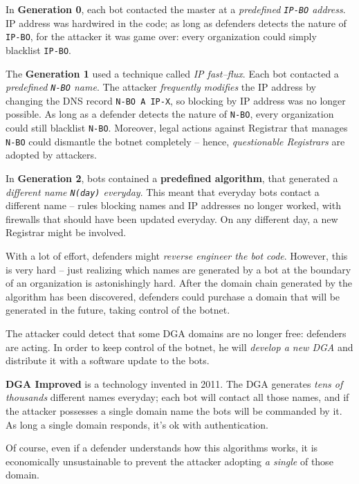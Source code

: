 \documentclass[10pt]{extbook}
\begin{document}
In \textbf{Generation 0}, each bot contacted the master at a \emph{predefined
\texttt{IP-BO} address}. IP address was hardwired in the code; as long as
defenders detects the nature of \texttt{IP-BO}, for the attacker it was game
over: every organization could simply blacklist \texttt{IP-BO}.

The \textbf{Generation 1} used a technique called \emph{IP fast--flux}. Each
bot contacted a \emph{predefined \texttt{N-BO} name}. The attacker
\emph{frequently modifies} the IP address by changing the DNS record
\texttt{N-BO A IP-X}, so blocking by IP address was no longer possible. As long
as a defender detects the nature of \texttt{N-BO}, every organization could
still blacklist \texttt{N-BO}. Moreover, legal actions against Registrar that
manages \texttt{N-BO} could dismantle the botnet completely -- hence,
\emph{questionable Registrars} are adopted by attackers.

In \textbf{Generation 2}, bots contained a \textbf{predefined algorithm}, that
generated a \emph{different name \texttt{N(day)} everyday}. This meant that
everyday bots contact a different name -- rules blocking names and IP addresses
no longer worked, with firewalls that should have been updated everyday. On any
different day, a new Registrar might be involved.

With a lot of effort, defenders might \emph{reverse engineer the bot code}.
However, this is very hard -- just realizing which names are generated by a bot
at the boundary of an organization is astonishingly hard. After the domain
chain generated by the algorithm has been discovered, defenders could purchase
a domain that will be generated in the future, taking control of the botnet.

The attacker could detect that some DGA domains are no longer free: defenders
are acting. In order to keep control of the botnet, he will \emph{develop a new
DGA} and distribute it with a software update to the bots.

\textbf{DGA Improved} is a technology invented in 2011. The DGA generates
\emph{tens of thousands} different names everyday; each bot will contact all
those names, and if the attacker possesses a single domain name the bots will
be commanded by it. As long a single domain responds, it's ok with
authentication.

Of course, even if a defender understands how this algorithms works, it is
economically unsustainable to prevent the attacker adopting \emph{a single}
of those domain.
\end{document}
